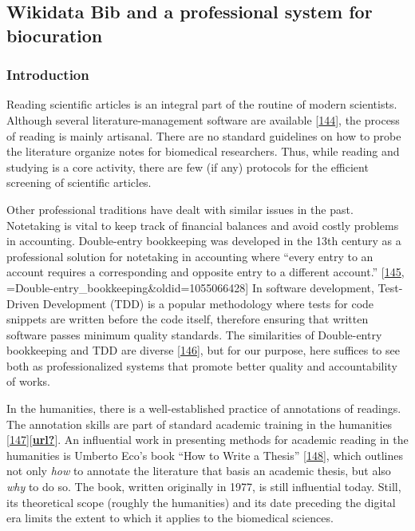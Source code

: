 \hypertarget{wikidata-bib-and-a-professional-system-for-biocuration}{%
\subsection{Wikidata Bib and a professional system for biocuration}\label{wikidata-bib-and-a-professional-system-for-biocuration}}

\hypertarget{introduction-1}{%
\subsubsection{Introduction}\label{introduction-1}}

Reading scientific articles is an integral part of the routine of modern scientists.
Although several literature-management software are available {[}\protect\hyperlink{ref-SdbIYKUa}{144}{]}, the process of reading is mainly artisanal.
There are no standard guidelines on how to probe the literature organize notes for biomedical researchers.
Thus, while reading and studying is a core activity, there are few (if any) protocols for the efficient screening of scientific articles.

Other professional traditions have dealt with similar issues in the past.
Notetaking is vital to keep track of financial balances and avoid costly problems in accounting.
Double-entry bookkeeping was developed in the 13th century as a professional solution for notetaking in accounting where ``every entry to an account requires a corresponding and opposite entry to a different account.'' {[}\protect\hyperlink{ref-uYuz0opI}{145}, =Double-entry\_bookkeeping\&oldid=1055066428{]}
In software development, Test-Driven Development (TDD) is a popular methodology where tests for code snippets are written before the code itself, therefore ensuring that written software passes minimum quality standards.
The similarities of Double-entry bookkeeping and TDD are diverse {[}\protect\hyperlink{ref-KNGv5MPp}{146}{]}, but for our purpose, here suffices to see both as professionalized systems that promote better quality and accountability of works.

In the humanities, there is a well-established practice of annotations of readings.
The annotation skills are part of standard academic training in the humanities {[}\protect\hyperlink{ref-rPKBwmYh}{147}{]}{[}\protect\hyperlink{ref-url}{\textbf{url?}}{]}.
An influential work in presenting methods for academic reading in the humanities is Umberto Eco's book ``How to Write a Thesis'' {[}\protect\hyperlink{ref-1HBVPtZGp}{148}{]}, which outlines not only \emph{how} to annotate the literature that basis an academic thesis, but also \emph{why} to do so.
The book, written originally in 1977, is still influential today.
Still, its theoretical scope (roughly the humanities) and its date preceding the digital era limits the extent to which it applies to the biomedical sciences.

